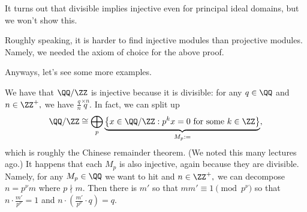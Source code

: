 \documentclass[../notes.tex]{subfiles}
\begin{document}
It turns out that divisible implies injective even for principal ideal domains, but we won't show this.
\begin{remark}
	Roughly speaking, it is harder to find injective modules than projective modules. Namely, we needed the axiom of choice for the above proof.
\end{remark}
Anyways, let's see some more examples.
\begin{ex}
	We have that $\QQ/\ZZ$ is injective because it is divisible: for any $q\in\QQ$ and $n\in\ZZ^+,$ we have $\frac qn\stackrel{\times n}q.$ In fact, we can split up
	\[\QQ/\ZZ\cong\bigoplus_p\underbrace{\left\{x\in\QQ/\ZZ:p^kx=0\text{ for some }k\in\ZZ\right\}}_{M_p:=},\]
	which is roughly the Chinese remainder theorem. (We noted this many lectures ago.) It happens that each $M_p$ is also injective, again because they are divisible. Namely, for any $M_p\in\QQ$ we want to hit and $n\in\ZZ^+,$ we can decompose $n=p^\nu m$ where $p\nmid m.$ Then there is $m'$ so that $mm'\equiv1\pmod{p^\nu}$ so that $n\cdot\frac{m'}{p^\nu}=1$ and $n\cdot\left(\frac{m'}{p^\nu}\cdot q\right)=q.$
\end{ex}
\end{document}

